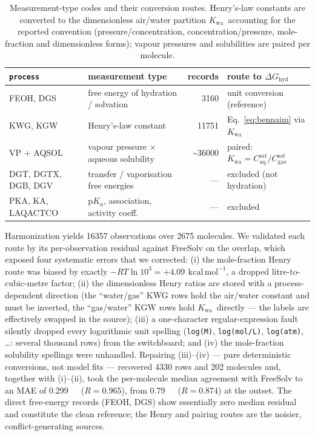 \documentclass[11pt]{article}
\newcommand{\dGhyd}{\ensuremath{\Delta G_{\mathrm{hyd}}}}
\newcommand{\Kwa}{\ensuremath{K_{\mathrm{wa}}}}
\newcommand{\kcal}{\,\mathrm{kcal\,mol^{-1}}}
\begin{document}
\begin{table}[t]
\centering
\small
\begin{tabular}{@{}llrl@{}}
\toprule
\texttt{process} & measurement type & records & route to \dGhyd \\
\midrule
FEOH, DGS & free energy of hydration / solvation & \num{3160} & unit conversion (reference) \\
KWG, KGW & Henry's-law constant & \num{11751} & Eq.~\eqref{eq:bennaim} via \Kwa \\
VP $+$ AQSOL & vapour pressure $\times$ aqueous solubility & \textasciitilde\num{36000} & paired: $\Kwa = C_{\mathrm{aq}}^{\mathrm{sat}}/C_{\mathrm{gas}}^{\mathrm{sat}}$ \\
DGT, DGTX, DGB, DGV & transfer / vaporisation free energies & --- & excluded (not hydration) \\
PKA, KA, LAQACTCO & p$K_a$, association, activity coeff. & --- & excluded \\
\bottomrule
\end{tabular}
\caption{Measurement-type codes and their conversion routes. Henry's-law constants are
converted to the dimensionless air/water partition \Kwa\ accounting for the reported
convention (pressure/concentration, concentration/pressure, mole-fraction and dimensionless
forms); vapour pressures and solubilities are paired per molecule.}
\label{tab:process}
\end{table}

Harmonization yields \num{16357} observations over \num{2675} molecules. We validated each route
by its per-observation residual against FreeSolv on the overlap, which exposed four systematic
errors that we corrected: (i) the mole-fraction Henry route was biased by exactly
$-RT\ln 10^3 = +\SI{4.09}{\kcal}$, a dropped litre-to-cubic-metre factor; (ii) the dimensionless
Henry ratios are stored with a process-dependent direction (the ``water/gas'' KWG rows hold the
air/water constant and must be inverted, the ``gas/water'' KGW rows hold \Kwa\ directly --- the
labels are effectively swapped in the source); (iii) a one-character regular-expression fault
silently dropped every logarithmic unit spelling (\texttt{log(M)}, \texttt{log(mol/L)},
\texttt{log(atm)}, \dots{}: several thousand rows) from the switchboard; and (iv) the mole-fraction
solubility spellings were unhandled. Repairing (iii)--(iv) --- pure deterministic conversions, not
model fits --- recovered \num{4330} rows and \num{202} molecules and, together with (i)--(ii),
took the per-molecule median agreement with FreeSolv to an MAE of \SI{0.299}{\kcal} ($R=0.965$),
from \SI{0.79}{\kcal} ($R=0.874$) at the outset. The direct free-energy records (FEOH, DGS) show
essentially zero median residual and constitute the clean reference; the Henry and pairing routes
are the noisier, conflict-generating sources.
\end{document}
